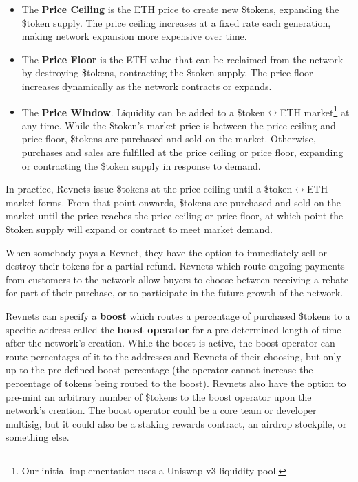 \documentclass{article}
\begin{document}
\begin{itemize}
  \item The \textbf{Price Ceiling} is the ETH price to create new \$tokens, expanding the \$token supply. The price ceiling increases at a fixed rate each generation, making network expansion more expensive over time.
  \item The \textbf{Price Floor} is the ETH value that can be reclaimed from the network by destroying \$tokens, contracting the \$token supply. The price floor increases dynamically as the network contracts or expands.
  \item The \textbf{Price Window}. Liquidity can be added to a \$token$\leftrightarrow$ETH market\footnote{Our initial implementation uses a Uniswap v3 liquidity pool.} at any time. While the \$token's market price is between the price ceiling and price floor, \$tokens are purchased and sold on the market. Otherwise, purchases and sales are fulfilled at the price ceiling or price floor, expanding or contracting the \$token supply in response to demand.
\end{itemize}

In practice, Revnets issue \$tokens at the price ceiling until a \$token$\leftrightarrow$ETH market forms. From that point onwards, \$tokens are purchased and sold on the market until the price reaches the price ceiling or price floor, at which point the \$token supply will expand or contract to meet market demand.

When somebody pays a Revnet, they have the option to immediately sell or destroy their tokens for a partial refund. Revnets which route ongoing payments from customers to the network allow buyers to choose between receiving a rebate for part of their purchase, or to participate in the future growth of the network.

Revnets can specify a \textbf{boost} which routes a percentage of purchased \$tokens to a specific address called the \textbf{boost operator} for a pre-determined length of time after the network's creation. While the boost is active, the boost operator can route percentages of it to the addresses and Revnets of their choosing, but only up to the pre-defined boost percentage (the operator cannot increase the percentage of tokens being routed to the boost). Revnets also have the option to pre-mint an arbitrary number of \$tokens to the boost operator upon the network's creation. The boost operator could be a core team or developer multisig, but it could also be a staking rewards contract, an airdrop stockpile, or something else. 
\end{document}
